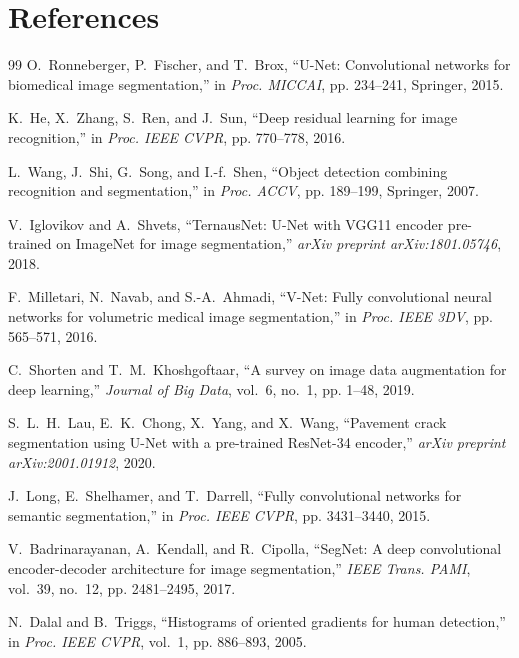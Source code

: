\documentclass[10pt,a4paper]{article}
\begin{document}
\section{References}
\begingroup
\renewcommand{\section}[2]{}%
\begin{thebibliography}{99}
O.~Ronneberger, P.~Fischer, and T.~Brox, ``U-Net: Convolutional networks for biomedical image segmentation,'' in \emph{Proc. MICCAI}, pp. 234--241, Springer, 2015.

K.~He, X.~Zhang, S.~Ren, and J.~Sun, ``Deep residual learning for image recognition,'' in \emph{Proc. IEEE CVPR}, pp. 770--778, 2016.

L.~Wang, J.~Shi, G.~Song, and I.-f.~Shen, ``Object detection combining recognition and segmentation,'' in \emph{Proc. ACCV}, pp. 189--199, Springer, 2007.

V.~Iglovikov and A.~Shvets, ``TernausNet: U-Net with VGG11 encoder pre-trained on ImageNet for image segmentation,'' \emph{arXiv preprint arXiv:1801.05746}, 2018.

F.~Milletari, N.~Navab, and S.-A.~Ahmadi, ``V-Net: Fully convolutional neural networks for volumetric medical image segmentation,'' in \emph{Proc. IEEE 3DV}, pp. 565--571, 2016.

C.~Shorten and T.~M.~Khoshgoftaar, ``A survey on image data augmentation for deep learning,'' \emph{Journal of Big Data}, vol.~6, no.~1, pp. 1--48, 2019.

S.~L.~H.~Lau, E.~K.~Chong, X.~Yang, and X.~Wang, ``Pavement crack segmentation using U-Net with a pre-trained ResNet-34 encoder,'' \emph{arXiv preprint arXiv:2001.01912}, 2020.

J.~Long, E.~Shelhamer, and T.~Darrell, ``Fully convolutional networks for semantic segmentation,'' in \emph{Proc. IEEE CVPR}, pp. 3431--3440, 2015.

V.~Badrinarayanan, A.~Kendall, and R.~Cipolla, ``SegNet: A deep convolutional encoder-decoder architecture for image segmentation,'' \emph{IEEE Trans. PAMI}, vol.~39, no.~12, pp. 2481--2495, 2017.

N.~Dalal and B.~Triggs, ``Histograms of oriented gradients for human detection,'' in \emph{Proc. IEEE CVPR}, vol.~1, pp. 886--893, 2005.


\end{thebibliography}
\end{document}

